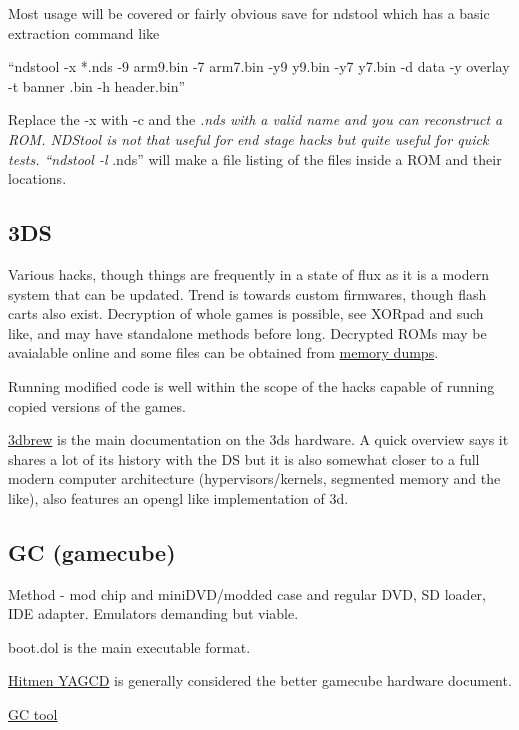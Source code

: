 \documentclass[
]{book}
\begin{document}
Most usage will be covered or fairly obvious save for ndstool which has a basic extraction command like

``ndstool -x *.nds -9 arm9.bin -7 arm7.bin -y9 y9.bin -y7 y7.bin -d data -y overlay -t banner .bin -h header.bin''

Replace the -x with -c and the \emph{.nds with a valid name and you can reconstruct a ROM. NDStool is not that useful for end stage hacks but quite useful for quick tests. ``ndstool -l }.nds'' will make a file listing of the files inside a ROM and their locations.

\hypertarget{ds-1}{%
\subsection{3DS}\label{ds-1}}

Various hacks, though things are frequently in a state of flux as it is a modern system that can be updated. Trend is towards custom firmwares, though flash carts also exist. Decryption of whole games is possible, see XORpad and such like, and may have standalone methods before long. Decrypted ROMs may be avaialable online and some files can be obtained from \href{http://gbatemp.net/threads/3ds-cwav-dumper.361437/}{memory dumps}.

Running modified code is well within the scope of the hacks capable of running copied versions of the games.

\href{http://3dbrew.org/wiki/Main_Page}{3dbrew} is the main documentation on the 3ds hardware. A quick overview says it shares a lot of its history with the DS but it is also somewhat closer to a full modern computer architecture (hypervisors/kernels, segmented memory and the like), also features an opengl like implementation of 3d.

\hypertarget{gc-gamecube}{%
\subsection{GC (gamecube)}\label{gc-gamecube}}

Method - mod chip and miniDVD/modded case and regular DVD, SD loader, IDE adapter. Emulators demanding but viable.

boot.dol is the main executable format.

\href{http://hitmen.c02.at/files/yagcd/yagcd/frames.html}{Hitmen YAGCD} is generally considered the better gamecube hardware document.

\href{http://filetrip.net/wii-downloads/other-files/download-gc-tool-120-beta-f818.html}{GC tool}
\end{document}
